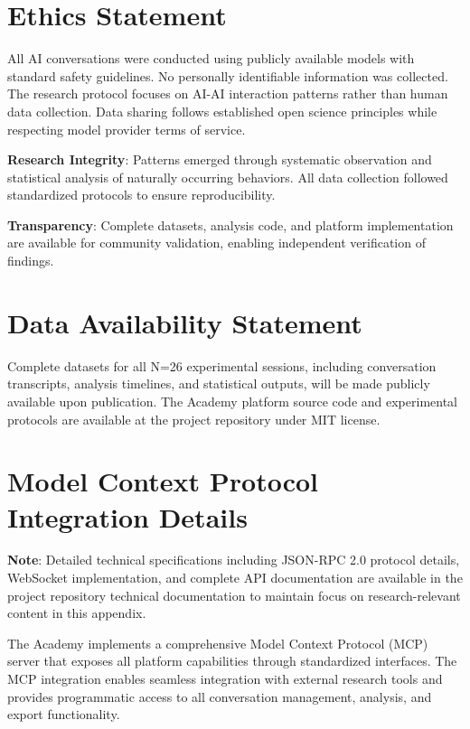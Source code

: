 \documentclass[11pt,letterpaper]{article}
\newcommand{\theacademy}{The Academy}
\newcommand{\exponedataTotalSessionsRaw}{26}
\newcommand{\exponedataTotalSessions}{N=\exponedataTotalSessionsRaw}
\begin{document}
\section{Ethics Statement}

All AI conversations were conducted using publicly available models with standard safety guidelines. No personally identifiable information was collected. The research protocol focuses on AI-AI interaction patterns rather than human data collection. Data sharing follows established open science principles while respecting model provider terms of service.

\textbf{Research Integrity}: Patterns emerged through systematic observation and statistical analysis of naturally occurring behaviors. All data collection followed standardized protocols to ensure reproducibility.

\textbf{Transparency}: Complete datasets, analysis code, and platform implementation are available for community validation, enabling independent verification of findings.

\section*{Data Availability Statement}

Complete datasets for all \exponedataTotalSessions{} experimental sessions, including conversation transcripts, analysis timelines, and statistical outputs, will be made publicly available upon publication. \theacademy{} platform source code and experimental protocols are available at the project repository under MIT license.




\appendix

\section{Model Context Protocol Integration Details}
\label{app:mcp}

\textbf{Note}: Detailed technical specifications including JSON-RPC 2.0 protocol details, WebSocket implementation, and complete API documentation are available in the project repository technical documentation to maintain focus on research-relevant content in this appendix.

\theacademy{} implements a comprehensive Model Context Protocol (MCP) server that exposes all platform capabilities through standardized interfaces. The MCP integration enables seamless integration with external research tools and provides programmatic access to all conversation management, analysis, and export functionality.
\end{document}
